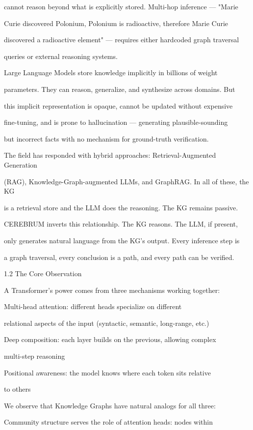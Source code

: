 \documentclass[10pt,journal,compsoc]{IEEEtran}
\begin{document}
cannot reason beyond what is explicitly stored. Multi-hop inference — "Marie

Curie discovered Polonium, Polonium is radioactive, therefore Marie Curie

discovered a radioactive element" — requires either hardcoded graph traversal

queries or external reasoning systems.

Large Language Models store knowledge implicitly in billions of weight

parameters. They can reason, generalize, and synthesize across domains. But

this implicit repre\-sentation is opaque, cannot be updated without expensive

fine-tuning, and is prone to hallu\-cination — generating plausible-sounding

but incorrect facts with no mechanism for ground-truth verif\-ication.

The field has responded with hybrid approaches: Retrieval-Augmented Generation

(RAG), Knowledge-Graph-augmented LLMs, and GraphRAG. In all of these, the KG

is a retrieval store and the LLM does the reasoning. The KG remains passive.

CEREBRUM inverts this relat\-ionship. The KG reasons. The LLM, if present,

only generates natural language from the KG's output. Every inference step is

a graph traversal, every conclusion is a path, and every path can be verified.

1.2 The Core Observation

A Transformer's power comes from three mechanisms working together:

Multi-head attention: different heads specialize on different

relational aspects of the input (syntactic, semantic, long-range, etc.)

Deep composition: each layer builds on the previous, allowing complex

multi-step reasoning

Positional awareness: the model knows where each token sits relative

to others

We observe that Knowledge Graphs have natural analogs for all three:

Community structure serves the role of attention heads: nodes within
\end{document}
